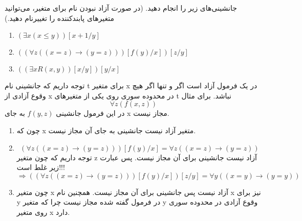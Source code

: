 
	جانشینی‌های زیر را انجام دهید. (در صورت آزاد نبودن نام برای متغیر، می‌توانید متغیرهای پابندکننده را تغییرنام دهید.)
	\begin{enumerate}[label=(\alph*)]
		\item $(\exists x (x \leq y))[x+1/y]$
		\item $((\forall z ((x = z) \rightarrow (y = z)))[f(y)/x])[z/y]$
		\item $((\exists x R(x, y))[x/y])[y/x]$
	\end{enumerate}
	\quad\vspace{0.5cm}
	\begin{ans}
		توجه داریم که جانشینی نام t برای متغیر x در یک فرمول آزاد است اگر و تنها اگر هیچ وقوع آزادی از x در محدوده سوری روی یکی از متغیر‌های t نباشد. 
		برای مثال
		$$
			\forall z(f(x, z))
		$$
		در این فرمول جانشینی 
		$
		 	f(y,z)
		$
		به جای x مجاز نیست.\\
		\begin{enumerate}[label=(\alph*)]
			\item 
			چون‌ که x متغیر آزاد نیست جانشینی به جای آن مجاز نیست.
			\item 
			$$
				(\forall z ((x = z) \rightarrow (y = z)))[f(y)/x] = \forall z ((x = z) \rightarrow (y = z))
			$$
			توجه داریم که چون متغیر z آزاد نیست جانشینی برای آن مجاز نیست. پس عبارت زیر غلط است!!!
			$$
				\Longrightarrow ((\forall z ((x = z) \rightarrow (y = z)))[f(y)/x])[z/y] = 
				\forall y ((x = y) \rightarrow (y = y))
			$$
			\item
			چون متغیر x آزاد نیست پس جانشینی برای آن مجاز نیست. همچنین نام x نیز برای y در فرمول گفته شده مجاز نیست چرا که متغیر y وقوع آزادی در محدوده سوری روی متغیر x دارد.
		\end{enumerate}
	\end{ans}
	
